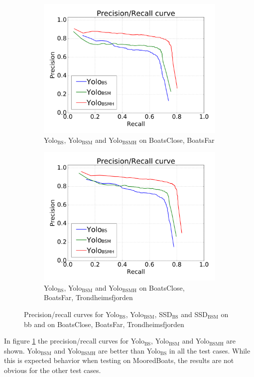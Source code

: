 \begin{figure}[h!]
\begin{subfigure}{.5\textwidth}
  \centering
  \includegraphics[width=0.8\linewidth]{results/case_tr_moor/prec_recall/bcbf-eps2.png}
  \caption{Yolo$_{\text{BS}}$, Yolo$_{\text{BSM}}$ and Yolo$_{\text{BSMH}}$ on BoatsClose, BoatsFar}
\end{subfigure}%
\begin{subfigure}{.5\textwidth}
  \centering
  \includegraphics[width=.8\linewidth]{results/case_tr_moor/prec_recall/bcbftrf-eps2.png}
  \caption{Yolo$_{\text{BS}}$, Yolo$_{\text{BSM}}$ and Yolo$_{\text{BSMH}}$  on BoatsClose, BoatsFar, Trondheimsfjorden}
\end{subfigure}
\caption{Precision/recall curves for Yolo$_{\text{BS}}$, Yolo$_{\text{BSM}}$, SSD$_{\text{BS}}$ and SSD$_{\text{BSM}}$ on bb and on BoatsClose, BoatsFar, Trondheimsfjorden}
\label{fig:prec_rec_case_moor}

\end{figure}

In figure \ref{fig:prec_rec_case_moor} the precision/recall curves for Yolo$_{\text{BS}}$, Yolo$_{\text{BSM}}$ and Yolo$_{\text{BSMH}}$ are shown. Yolo$_{\text{BSM}}$ and Yolo$_{\text{BSMH}}$ are better than Yolo$_{\text{BS}}$ in all the test cases. While this is expected behavior when testing on MooredBoats, the results are not obvious for the other test cases. 

